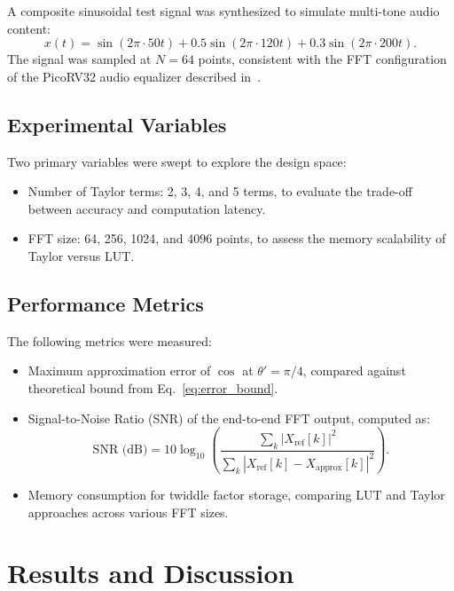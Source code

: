 \documentclass[conference]{IEEEtran}
\begin{document}
A composite sinusoidal test signal was synthesized to simulate multi-tone audio
content:
\begin{equation}
x(t) = \sin(2\pi \cdot 50 t) + 0.5 \sin(2\pi \cdot 120 t) + 0.3 \sin(2\pi \cdot 200 t).
\label{eq:test_signal}
\end{equation}
The signal was sampled at $N = 64$ points, consistent with the FFT configuration
of the PicoRV32 audio equalizer described in~\cite{qohar2026picorv32}.

\subsection{Experimental Variables}

Two primary variables were swept to explore the design space:
\begin{itemize}
    \item Number of Taylor terms: 2, 3, 4, and 5 terms, to evaluate the
    trade-off between accuracy and computation latency.
    \item FFT size: 64, 256, 1024, and 4096 points, to assess the
    memory scalability of Taylor versus LUT.
\end{itemize}

\subsection{Performance Metrics}

The following metrics were measured:
\begin{itemize}
    \item Maximum approximation error of $\cos$ at $\theta' = \pi/4$,
    compared against theoretical bound from Eq.~\eqref{eq:error_bound}.
    \item Signal-to-Noise Ratio (SNR) of the end-to-end FFT output,
    computed as:
    \begin{equation}
    \text{SNR (dB)} = 10 \log_{10} \left( \frac{\sum_k |X_{\text{ref}}[k]|^2}{\sum_k |X_{\text{ref}}[k] - X_{\text{approx}}[k]|^2} \right).
    \label{eq:snr}
    \end{equation}
    \item Memory consumption for twiddle factor storage, comparing LUT
    and Taylor approaches across various FFT sizes.
\end{itemize}

\section{Results and Discussion}
\label{sec:results}
\end{document}
